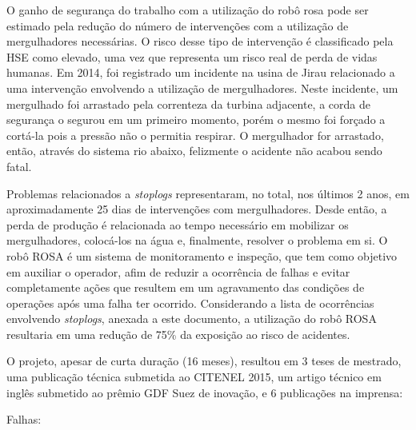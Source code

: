 \begin{itemize}
O ganho de segurança do trabalho com a utilização do robô rosa pode ser estimado
pela redução do número de intervenções com a utilização de mergulhadores
necessárias. O risco desse tipo de intervenção é classificado pela HSE como
elevado, uma vez que representa um risco real de perda de vidas humanas. Em
2014, foi registrado um incidente na usina de Jirau relacionado a uma
intervenção envolvendo a utilização de mergulhadores. Neste incidente, um
mergulhado foi arrastado pela correnteza da turbina adjacente, a corda de
segurança o segurou em um primeiro momento, porém o mesmo foi forçado a cortá-la
pois a pressão não o permitia respirar. O mergulhador for arrastado, então,
através do sistema rio abaixo, felizmente o acidente não acabou sendo fatal.

Problemas relacionados a \textit{stoplogs} representaram, no total, nos últimos
2 anos, em aproximadamente 25 dias de intervenções com mergulhadores. Desde
então, a perda de produção é relacionada ao tempo necessário em mobilizar os
mergulhadores, colocá-los na água e, finalmente, resolver o problema em si. O
robô ROSA é um sistema de monitoramento e inspeção, que tem como objetivo
em auxiliar o operador, afim de reduzir a ocorrência de falhas e evitar
completamente ações que resultem em um agravamento das condições de operações
após uma falha ter ocorrido. Considerando a lista de ocorrências envolvendo
\textit{stoplogs}, anexada a este documento, a utilização do robô ROSA
resultaria em uma redução de 75\% da exposição ao risco de acidentes. 

O projeto, apesar de curta duração (16 meses), resultou em 3 teses de 
mestrado, uma publicação técnica submetida ao CITENEL 2015, um artigo técnico 
em inglês submetido ao prêmio GDF Suez de inovação, e 6 publicações na imprensa: 

Falhas:


\end{itemize}
